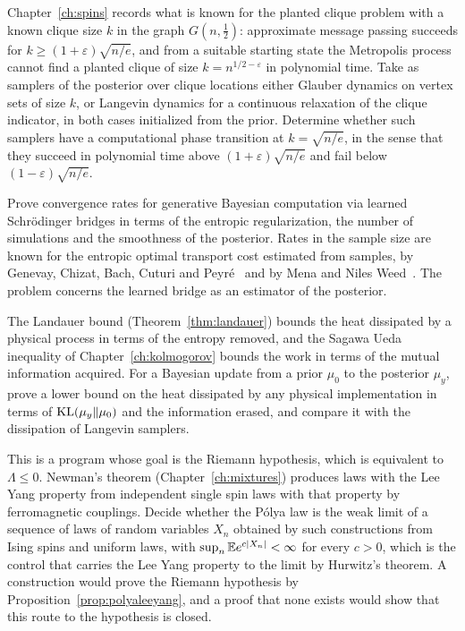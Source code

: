 \begin{problem}\label{prob:phase_transitions}%
Chapter~\ref{ch:spins} records what is known for the planted clique problem with a known clique size $k$ in the graph $G(n,\frac12)$: approximate message passing succeeds for $k\geq(1+\varepsilon)\sqrt{n/e}$, and from a suitable starting state the Metropolis process cannot find a planted clique of size $k = n^{1/2-\varepsilon}$ in polynomial time. Take as samplers of the posterior over clique locations either Glauber dynamics on vertex sets of size $k$, or Langevin dynamics for a continuous relaxation of the clique indicator, in both cases initialized from the prior. Determine whether such samplers have a computational phase transition at $k = \sqrt{n/e}$, in the sense that they succeed in polynomial time above $(1+\varepsilon)\sqrt{n/e}$ and fail below $(1-\varepsilon)\sqrt{n/e}$.
\end{problem}

\begin{problem}[Transport]\label{prob:transport}%
Prove convergence rates for generative Bayesian computation via learned Schr\"odinger bridges in terms of the entropic regularization, the number of simulations and the smoothness of the posterior. Rates in the sample size are known for the entropic optimal transport cost estimated from samples, by Genevay, Chizat, Bach, Cuturi and Peyr\'e~\cite{genevay2019} and by Mena and Niles Weed~\cite{menaniles2019}. The problem concerns the learned bridge as an estimator of the posterior.
\end{problem}

\begin{problem}\label{prob:thermodynamics_of_inference}%
The Landauer bound (Theorem~\ref{thm:landauer}) bounds the heat dissipated by a physical process in terms of the entropy removed, and the Sagawa Ueda inequality of Chapter~\ref{ch:kolmogorov} bounds the work in terms of the mutual information acquired. For a Bayesian update from a prior $\mu_0$ to the posterior $\mu_y$, prove a lower bound on the heat dissipated by any physical implementation in terms of $\mathrm{KL}(\mu_y\|\mu_0)$ and the information erased, and compare it with the dissipation of Langevin samplers.
\end{problem}

\begin{problem}\label{prob:bridge}%
This is a program whose goal is the Riemann hypothesis, which is equivalent to $\Lambda\leq0$. Newman's theorem (Chapter~\ref{ch:mixtures}) produces laws with the Lee Yang property from independent single spin laws with that property by ferromagnetic couplings. Decide whether the P\'olya law is the weak limit of a sequence of laws of random variables $X_n$ obtained by such constructions from Ising spins and uniform laws, with $\sup_n\mathbb{E} e^{c|X_n|}<\infty$ for every $c>0$, which is the control that carries the Lee Yang property to the limit by Hurwitz's theorem. A construction would prove the Riemann hypothesis by Proposition~\ref{prop:polyaleeyang}, and a proof that none exists would show that this route to the hypothesis is closed.
\end{problem}

